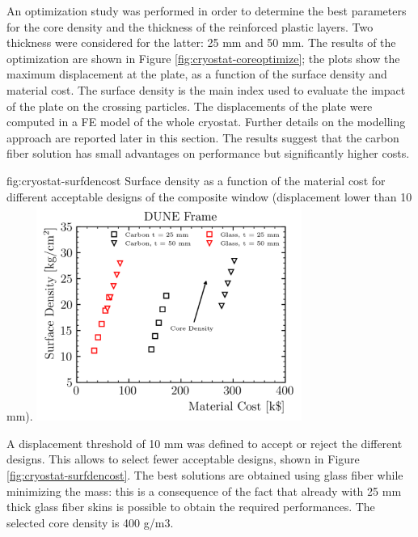 An optimization study was performed in order to determine the best parameters for the core density and the thickness of the reinforced plastic layers. Two thickness were considered for the latter: 25 mm and 50 mm. The results of the optimization are shown in Figure \ref{fig:cryostat-coreoptimize}; the plots show the maximum displacement at the plate, as a function of the surface density and material cost. The surface density is the main index used to evaluate the impact of the plate on the crossing particles. The displacements of the plate were computed in a FE model of the whole cryostat. Further details on the modelling approach are reported later in this section. The results suggest that the carbon fiber solution has small advantages on performance but significantly higher costs.

\begin{dunefigure}{fig:cryostat-surfdencost}
{Surface density as a function of the material cost for different acceptable designs of the composite window (displacement lower than 10 mm).}
\includegraphics[width=0.65\textwidth]{graphics/cryostat/cryostat-surfdencost.png}
\end{dunefigure}

A displacement threshold of 10 mm was defined to accept or reject the different designs. This allows to select fewer acceptable designs, shown in Figure \ref{fig:cryostat-surfdencost}. The best solutions are obtained using glass fiber while minimizing the mass: this is a consequence of the fact that already with 25 mm thick glass fiber skins is possible to obtain the required performances. The selected core density is 400 g/m3. 


